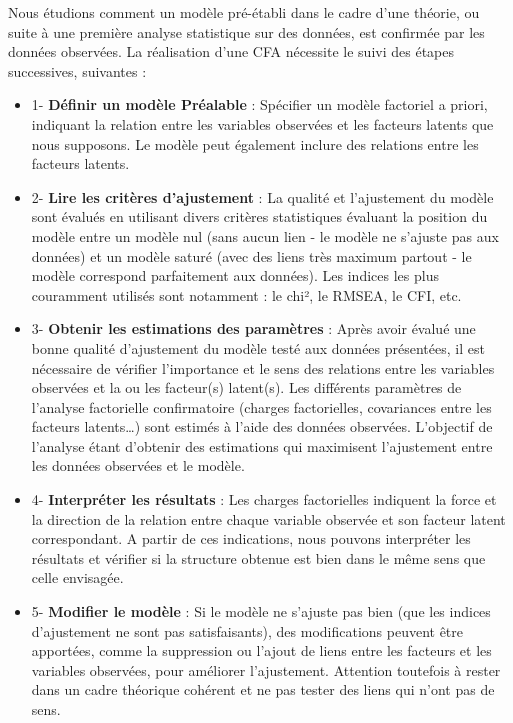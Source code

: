 \documentclass[
  french,
  11pt,
  a4paper,
]{article}
\begin{document}
Nous étudions comment un modèle pré-établi dans le cadre d'une théorie,
ou suite à une première analyse statistique sur des données, est
confirmée par les données observées. La réalisation d'une CFA nécessite
le suivi des étapes successives, suivantes :

\begin{itemize}
\item
  1- \textbf{Définir un modèle Préalable} : Spécifier un modèle
  factoriel a priori, indiquant la relation entre les variables
  observées et les facteurs latents que nous supposons. Le modèle peut
  également inclure des relations entre les facteurs latents.
\item
  2- \textbf{Lire les critères d'ajustement} : La qualité et
  l'ajustement du modèle sont évalués en utilisant divers critères
  statistiques évaluant la position du modèle entre un modèle nul (sans
  aucun lien - le modèle ne s'ajuste pas aux données) et un modèle
  saturé (avec des liens très maximum partout - le modèle correspond
  parfaitement aux données). Les indices les plus couramment utilisés
  sont notamment : le chi², le RMSEA, le CFI, etc.
\item
  3- \textbf{Obtenir les estimations des paramètres} : Après avoir
  évalué une bonne qualité d'ajustement du modèle testé aux données
  présentées, il est nécessaire de vérifier l'importance et le sens des
  relations entre les variables observées et la ou les facteur(s)
  latent(s). Les différents paramètres de l'analyse factorielle
  confirmatoire (charges factorielles, covariances entre les facteurs
  latents\ldots) sont estimés à l'aide des données observées. L'objectif
  de l'analyse étant d'obtenir des estimations qui maximisent
  l'ajustement entre les données observées et le modèle.
\item
  4- \textbf{Interpréter les résultats} : Les charges factorielles
  indiquent la force et la direction de la relation entre chaque
  variable observée et son facteur latent correspondant. A partir de ces
  indications, nous pouvons interpréter les résultats et vérifier si la
  structure obtenue est bien dans le même sens que celle envisagée.
\item
  5- \textbf{Modifier le modèle} : Si le modèle ne s'ajuste pas bien
  (que les indices d'ajustement ne sont pas satisfaisants), des
  modifications peuvent être apportées, comme la suppression ou l'ajout
  de liens entre les facteurs et les variables observées, pour améliorer
  l'ajustement. Attention toutefois à rester dans un cadre théorique
  cohérent et ne pas tester des liens qui n'ont pas de sens.
\end{itemize}
\end{document}
